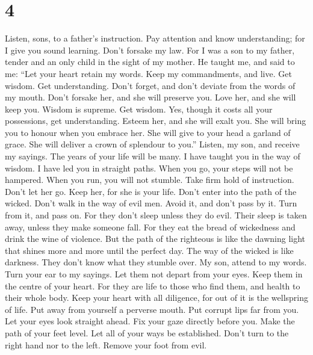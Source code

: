 \hypertarget{section-3}{%
\section{4}\label{section-3}}

 Listen, sons, to a father's instruction. Pay attention
and know understanding;  for I give you sound learning.
Don't forsake my law.  For I was a son to my father,
tender and an only child in the sight of my mother.  He
taught me, and said to me: ``Let your heart retain my words. Keep my
commandments, and live.  Get wisdom. Get understanding.
Don't forget, and don't deviate from the words of my mouth.
 Don't forsake her, and she will preserve you. Love her,
and she will keep you.  Wisdom is supreme. Get wisdom.
Yes, though it costs all your possessions, get understanding.
 Esteem her, and she will exalt you. She will bring you to
honour when you embrace her.  She will give to your head a
garland of grace. She will deliver a crown of splendour to you.''
 Listen, my son, and receive my sayings. The years of
your life will be many.  I have taught you in the way of
wisdom. I have led you in straight paths.  When you go,
your steps will not be hampered. When you run, you will not stumble.
 Take firm hold of instruction. Don't let her go. Keep
her, for she is your life.  Don't enter into the path of
the wicked. Don't walk in the way of evil men.  Avoid it,
and don't pass by it. Turn from it, and pass on.  For
they don't sleep unless they do evil. Their sleep is taken away, unless
they make someone fall.  For they eat the bread of
wickedness and drink the wine of violence.  But the path
of the righteous is like the dawning light that shines more and more
until the perfect day.  The way of the wicked is like
darkness. They don't know what they stumble over.  My
son, attend to my words. Turn your ear to my sayings. 
Let them not depart from your eyes. Keep them in the centre of your
heart.  For they are life to those who find them, and
health to their whole body.  Keep your heart with all
diligence, for out of it is the wellspring of life.  Put
away from yourself a perverse mouth. Put corrupt lips far from you.
 Let your eyes look straight ahead. Fix your gaze
directly before you.  Make the path of your feet level.
Let all of your ways be established.  Don't turn to the
right hand nor to the left. Remove your foot from evil.

